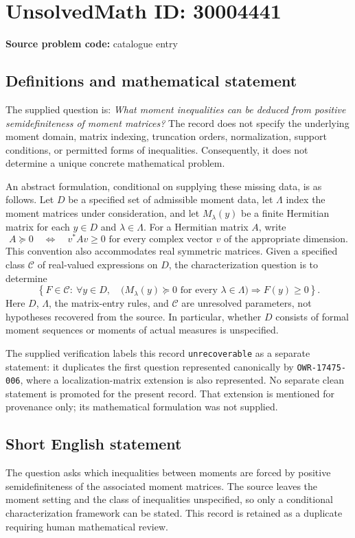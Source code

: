 \documentclass[11pt]{article}
\begin{document}
\section*{UnsolvedMath ID: 30004441}
\textbf{Source problem code:} catalogue entry
\subsection{Definitions and mathematical statement}
The supplied question is: \emph{What moment inequalities can be deduced from positive semidefiniteness of moment matrices?} The record does not specify the underlying moment domain, matrix indexing, truncation orders, normalization, support conditions, or permitted forms of inequalities. Consequently, it does not determine a unique concrete mathematical problem.

An abstract formulation, conditional on supplying these missing data, is as follows. Let \(D\) be a specified set of admissible moment data, let \(\Lambda\) index the moment matrices under consideration, and let \(M_\lambda(y)\) be a finite Hermitian matrix for each \(y\in D\) and \(\lambda\in\Lambda\). For a Hermitian matrix \(A\), write
\[
A\succeq0 \quad\Longleftrightarrow\quad v^*Av\geq0\text{ for every complex vector }v\text{ of the appropriate dimension}.
\]
This convention also accommodates real symmetric matrices. Given a specified class \(\mathcal C\) of real-valued expressions on \(D\), the characterization question is to determine
\[
\left\{F\in\mathcal C:\ \forall y\in D,\quad
\bigl(M_\lambda(y)\succeq0\text{ for every }\lambda\in\Lambda\bigr)
\Longrightarrow F(y)\geq0\right\}.
\]
Here \(D\), \(\Lambda\), the matrix-entry rules, and \(\mathcal C\) are unresolved parameters, not hypotheses recovered from the source. In particular, whether \(D\) consists of formal moment sequences or moments of actual measures is unspecified.

The supplied verification labels this record \texttt{unrecoverable} as a separate statement: it duplicates the first question represented canonically by \texttt{OWR-17475-006}, where a localization-matrix extension is also represented. No separate clean statement is promoted for the present record. That extension is mentioned for provenance only; its mathematical formulation was not supplied.
\subsection{Short English statement}
The question asks which inequalities between moments are forced by positive semidefiniteness of the associated moment matrices. The source leaves the moment setting and the class of inequalities unspecified, so only a conditional characterization framework can be stated. This record is retained as a duplicate requiring human mathematical review.
\end{document}
